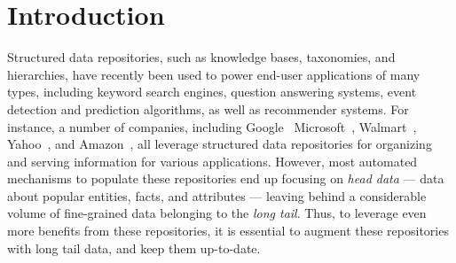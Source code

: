 


\section{Introduction}
\label{sec:intro}


Structured data repositories, such as knowledge bases, taxono\-mies, and hierarchies, have recently been used to
power end-user applications of many types, including keyword search engines,
question answering systems, event detection and prediction algorithms, 
as well as recommender systems. 
For instance, a number of companies, including 
Google~\cite{singhal2012introducing}
Microsoft~\cite{cheng2010fuzzy}, Walmart~\cite{Deshpande:2013:BMU:2463676.2465297}, Yahoo~\cite{woo}, and Amazon~\cite{amazon-product}, all leverage
structured data repositories for organizing and serving information
for various applications. 
However, most automated mechanisms to populate these repositories 
end up focusing on {\em head data} --- data about popular entities, facts, 
and attributes --- leaving behind a considerable volume of fine-grained
data belonging to the {\em long tail}. 
Thus, to leverage even more benefits from these repositories, it is
essential to augment these repositories with long tail data, and keep
them up-to-date. 


